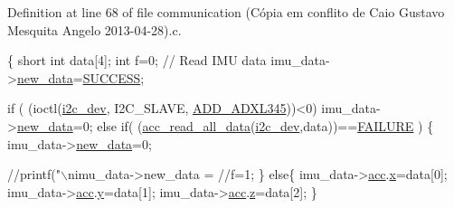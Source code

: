 Definition at line 68 of file communication (\-Cópia em conflito de Caio Gustavo Mesquita Angelo 2013-\/04-\/28).\-c.


\begin{DoxyCode}
\{
  \textcolor{keywordtype}{short} \textcolor{keywordtype}{int} data[4];
  \textcolor{keywordtype}{int} f=0;
  \textcolor{comment}{// Read IMU data}
  imu\_data->\hyperlink{structIMU__DATA__STRUCT_a99924252176326418863e511d4fa437b}{new\_data}=\hyperlink{communication_01_07C_xC3_xB3pia_01em_01conflito_01de_01Caio_01Gustavo_01Mesquita_01Angelo_012013-04-28_08_8h_aa90cac659d18e8ef6294c7ae337f6b58}{SUCCESS};
  
  \textcolor{keywordflow}{if} ( (ioctl(\hyperlink{CommunicationV0_2communication_8c_a7751bd45ac1064efb35adf1f19c25db8}{i2c\_dev}, I2C\_SLAVE, \hyperlink{imu__functions_01_07C_xC3_xB3pia_01em_01conflito_01de_01Andr_xC3_xA9_01Carvalho_012013-04-26_08_8h_a909f4a5773e20e672cdb4088e1cfa22f}{ADD\_ADXL345}))<0) 
        imu\_data->\hyperlink{structIMU__DATA__STRUCT_a99924252176326418863e511d4fa437b}{new\_data}=0;
  \textcolor{keywordflow}{else} \textcolor{keywordflow}{if}( (\hyperlink{group__acc_ga013bb5ed8a763883fc440549d2b1a6ce}{acc\_read\_all\_data}(\hyperlink{CommunicationV0_2communication_8c_a7751bd45ac1064efb35adf1f19c25db8}{i2c\_dev},data))==\hyperlink{communication_01_07C_xC3_xB3pia_01em_01conflito_01de_01Caio_01Gustavo_01Mesquita_01Angelo_012013-04-28_08_8h_a6d58f9ac447476b4e084d7ca383f5183}{FAILURE}
       )
  \{
        imu\_data->\hyperlink{structIMU__DATA__STRUCT_a99924252176326418863e511d4fa437b}{new\_data}=0;
        \textcolor{comment}{//printf("\(\backslash\)nimu\_data->new\_data = %
        \textcolor{comment}{//f=1;}
  \}
  \textcolor{keywordflow}{else}\{
    imu\_data->\hyperlink{structIMU__DATA__STRUCT_a448f284bf44eb503affda586ad5fa9d2}{acc}.\hyperlink{structDATA__XYZ_a54c1596e9f9969fd9c21e8458024ecfb}{x}=data[0];
    imu\_data->\hyperlink{structIMU__DATA__STRUCT_a448f284bf44eb503affda586ad5fa9d2}{acc}.\hyperlink{structDATA__XYZ_a94bbb1c889bf53eb6a5fffa2b39322cf}{y}=data[1];
    imu\_data->\hyperlink{structIMU__DATA__STRUCT_a448f284bf44eb503affda586ad5fa9d2}{acc}.\hyperlink{structDATA__XYZ_a69e89ab0ec6e5d72fc5d54f62cc07fb5}{z}=data[2];  
  \}
  
}
\end{DoxyCode}
